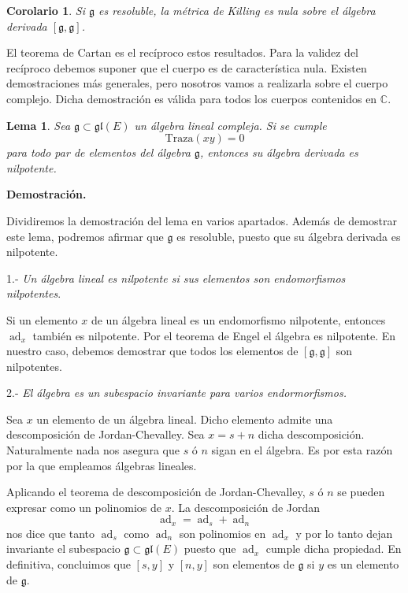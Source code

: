 \documentclass[a4paper,draft,12pt]{scrartcl}
\newtheorem{lema}[teo]{Lema}%
\newtheorem{cor}[teo]{Corolario}%
\newcommand{\dem}{\noindent \textbf{Demostración. }\vspace{0.3 cm}}%
\newcommand{\C}{\mathbb{C}}%
\newcommand{\g}{\mathfrak{g}}%
\DeclareMathOperator{\ad}{ad}  %
\begin{document}
 \begin{cor}
 
 Si $\g$ es resoluble, la métrica de Killing es nula sobre el álgebra derivada $[\g,\g]$.
 
 \end{cor}
 

 
 
 
 
 
 
 El teorema de Cartan es el recíproco estos resultados.  Para la validez del recíproco debemos suponer que el cuerpo es de característica nula.  Existen demostraciones más generales, pero nosotros vamos a realizarla sobre el cuerpo complejo.  Dicha demostración es válida para todos los cuerpos contenidos en $\C$.
 
 \begin{lema}
 
 Sea $\g \subset \mathfrak{gl}(E)$ un álgebra lineal compleja.  Si se cumple
 $$
 \mathrm{Traza}(xy)=0
 $$
 para todo par de elementos del álgebra $\g$, entonces su álgebra derivada es nilpotente.
 
 \end{lema}
 
 \dem
 
 Dividiremos la demostración del lema en varios apartados. Además de demostrar este lema, podremos afirmar que $\g$ es resoluble, puesto que su álgebra derivada es nilpotente.
 
 \bigskip
 
 1.- \textit{Un álgebra lineal es nilpotente si sus elementos son endomorfismos nilpotentes}.
 
   Si un elemento $x$ de un álgebra lineal es un endomorfismo nilpotente, entonces $\ad_x$ también es nilpotente.  Por el teorema de Engel el álgebra es nilpotente. En nuestro caso, debemos demostrar  que todos los elementos de $[\g,\g]$ son nilpotentes.
 
 \bigskip
 
 2.- \textit{El álgebra es un subespacio invariante para varios endormorfismos.}
 
 
 
 Sea $x $ un elemento de un álgebra lineal.  Dicho elemento admite una descomposición de Jordan-Cheva\-lley.  Sea $x = s+n$ dicha descomposición.  Naturalmente nada nos asegura que $s$ ó $n$ sigan en el álgebra. Es por esta razón por la que empleamos álgebras lineales. 
 
 Aplicando el teorema de descomposición de Jordan-Chevalley,  $s$ ó $n$ se pueden expresar como un polinomios de $x$.    La descomposición de Jordan 
 $$
 \ad_x=\ad_s+\ad_n
 $$  nos dice que tanto $\ad_s$ como $\ad_n$ son polinomios en $\ad_x$ y por lo tanto dejan invariante el subespacio $\g\subset \mathfrak{gl}(E)$ puesto que $\ad_x$ cumple dicha propiedad. En definitiva, concluimos que $[s,y]$ y $[n,y]$ son elementos de $\g$ si $y$ es un elemento de $\g$.
 
\end{document}
